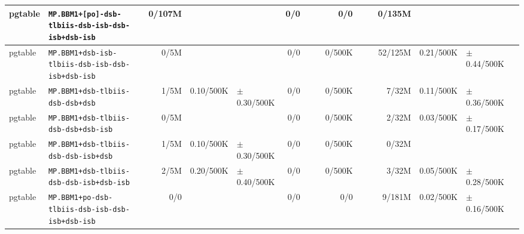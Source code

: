 \begin{tabular}{l l  | r r l | r r l | r r l | r r l l}
         pgtable &     \verb|MP.BBM1+[po]-dsb-tlbiis-dsb-isb-dsb-isb+dsb-isb| &         0/107M &                       &                   &            0/0 &                       &                 &            0/0 &                       &                   &         0/135M &                       &                   & \\ \hline 
         pgtable &      \verb|MP.BBM1+dsb-isb-tlbiis-dsb-isb-dsb-isb+dsb-isb| &           0/5M &                       &                   &            0/0 &                       &                 &         0/500K &                       &                   &        52/125M &             0.21/500K &   $\pm$ 0.44/500K & \\ \hline 
         pgtable &                      \verb|MP.BBM1+dsb-tlbiis-dsb-dsb+dsb| &           1/5M &             0.10/500K &   $\pm$ 0.30/500K &            0/0 &                       &                 &         0/500K &                       &                   &          7/32M &             0.11/500K &   $\pm$ 0.36/500K & \\ \hline 
         pgtable &                  \verb|MP.BBM1+dsb-tlbiis-dsb-dsb+dsb-isb| &           0/5M &                       &                   &            0/0 &                       &                 &         0/500K &                       &                   &          2/32M &             0.03/500K &   $\pm$ 0.17/500K & \\ \hline 
         pgtable &                  \verb|MP.BBM1+dsb-tlbiis-dsb-dsb-isb+dsb| &           1/5M &             0.10/500K &   $\pm$ 0.30/500K &            0/0 &                       &                 &         0/500K &                       &                   &          0/32M &                       &                   & \\ \hline 
         pgtable &              \verb|MP.BBM1+dsb-tlbiis-dsb-dsb-isb+dsb-isb| &           2/5M &             0.20/500K &   $\pm$ 0.40/500K &            0/0 &                       &                 &         0/500K &                       &                   &          3/32M &             0.05/500K &   $\pm$ 0.28/500K & \\ \hline 
         pgtable &       \verb|MP.BBM1+po-dsb-tlbiis-dsb-isb-dsb-isb+dsb-isb| &            0/0 &                       &                   &            0/0 &                       &                 &            0/0 &                       &                   &         9/181M &             0.02/500K &   $\pm$ 0.16/500K & \\ \hline 

\end{tabular}
